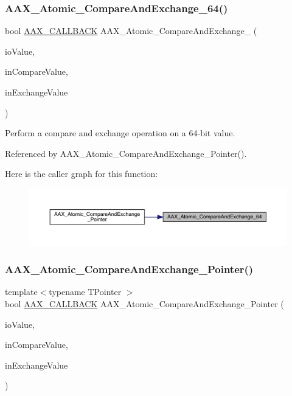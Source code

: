 \subsubsection{\texorpdfstring{AAX\_Atomic\_CompareAndExchange\_64()}{AAX\_Atomic\_CompareAndExchange\_64()}}
{\footnotesize\ttfamily bool \mbox{\hyperlink{a00392_aaa22112139aa627574b1ef562f579d43}{A\+A\+X\+\_\+\+C\+A\+L\+L\+B\+A\+CK}} A\+A\+X\+\_\+\+Atomic\+\_\+\+Compare\+And\+Exchange\+\_ (\begin{DoxyParamCaption}\item[{volatile uint64\+\_\+t \&}]{io\+Value,  }\item[{uint64\+\_\+t}]{in\+Compare\+Value,  }\item[{uint64\+\_\+t}]{in\+Exchange\+Value }\end{DoxyParamCaption})}



Perform a compare and exchange operation on a 64-\/bit value. 



Referenced by A\+A\+X\+\_\+\+Atomic\+\_\+\+Compare\+And\+Exchange\+\_\+\+Pointer().

Here is the caller graph for this function\+:
\nopagebreak
\begin{figure}[H]
\begin{center}
\leavevmode
\includegraphics[width=350pt]{a00398_ae1e5b0cf8d8c7a301e13772a57a3d2fd_icgraph}
\end{center}
\end{figure}
\mbox{\label{a00398_ab1c7611e7c95fd61900b8e5a44c36e63}} 
\subsubsection{\texorpdfstring{AAX\_Atomic\_CompareAndExchange\_Pointer()}{AAX\_Atomic\_CompareAndExchange\_Pointer()}}
{\footnotesize\ttfamily template$<$typename T\+Pointer $>$ \\
bool \mbox{\hyperlink{a00392_aaa22112139aa627574b1ef562f579d43}{A\+A\+X\+\_\+\+C\+A\+L\+L\+B\+A\+CK}} A\+A\+X\+\_\+\+Atomic\+\_\+\+Compare\+And\+Exchange\+\_\+\+Pointer (\begin{DoxyParamCaption}\item[{T\+Pointer $\ast$\&}]{io\+Value,  }\item[{T\+Pointer $\ast$}]{in\+Compare\+Value,  }\item[{T\+Pointer $\ast$}]{in\+Exchange\+Value }\end{DoxyParamCaption})}



